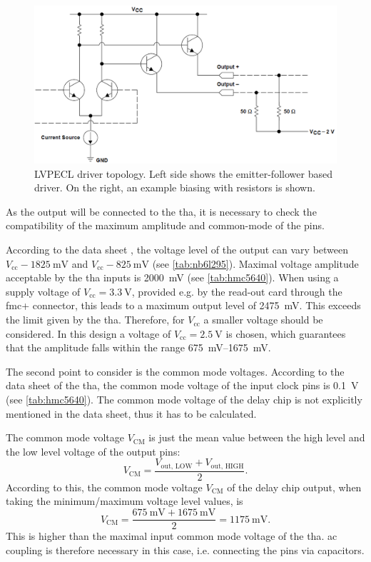\begin{figure}[tbh]
	\centering
	\includegraphics[width = \textwidth]{chap/04-work/img/lvpecl}
	\caption[LVPECL driver topology]{LVPECL driver topology. Left side shows the emitter-follower based driver. On the right, an example biasing with resistors is shown. \cite{lvpecl}}
	\label{fig:lvpecl}
\end{figure}

As the output will be connected to the \gls{tha}, it is necessary to check the compatibility of the maximum amplitude and common-mode of the pins.

According to the data sheet \cite{NB6L295}, the voltage level of the output can vary between  $V_\text{cc} - \SI{1825}{\milli\volt}$ and $V_\text{cc} - \SI{825}{\milli\volt}$ (see \autoref{tab:nb6l295}).
Maximal voltage amplitude acceptable by the \gls{tha} inputs is \SI{2000}{\milli\volt} (see \autoref{tab:hmc5640}).
When using a supply voltage of $V_\text{cc} = \SI{3.3}{\volt}$, provided e.g. by the read-out card through the \gls{fmc}+ connector, this leads to a maximum output level of \SI{2475}{\milli\volt}.
This exceeds the limit given by the \gls{tha}.
Therefore, for $V_\text{cc}$ a smaller voltage should be considered.
In this design a voltage of $V_\text{cc} = \SI{2.5}{\volt}$ is chosen, which guarantees that the amplitude falls within the range \SIrange{675}{1675}{\milli\volt}.

The second point to consider is the common mode voltages. 
According to the data sheet of the \gls{tha}, the common mode voltage of the input clock pins is \SI{0.1}{\volt} (see \autoref{tab:hmc5640}).
The common mode voltage of the delay chip is not explicitly mentioned in the data sheet, thus it has to be calculated.

The common mode voltage $V_\text{CM}$ is just the mean value between the high level and the low level voltage of the output pins:
\begin{equation}
	V_\text{CM} = \frac{V_\text{out, LOW} + V_\text{out, HIGH}}{2}.
\end{equation}
According to this, the common mode voltage $V_{\text{CM}}$ of the delay chip output, when taking the minimum/maximum voltage level values, is 
\begin{equation}
	V_\text{CM} = \frac{\SI{675}{\milli \volt} + \SI{1675}{\milli \volt}}{2} = \SI{1175}{\milli \volt}.
\end{equation}
This is higher than the maximal input common mode voltage of the \gls{tha}.
\gls{ac} coupling is therefore necessary in this case, i.e. connecting the pins via capacitors.

